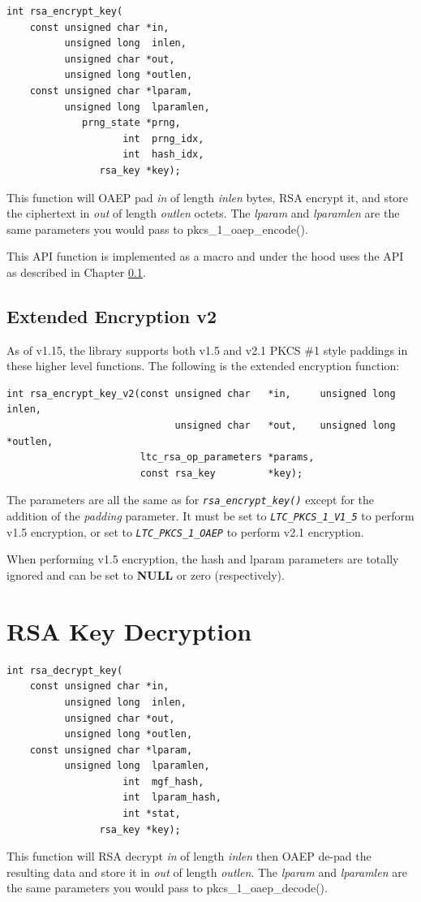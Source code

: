 \documentclass[synpaper]{book}
\newcommand{\code}[1]{\texttt{\textit{#1}}}
\newcommand{\mysection}[1]    %
	{                   %
	\section{#1}
   \markboth{\textsf{www.libtom.net}}{\thesection ~ {#1}}
	}
\begin{document}
\begin{verbatim}
int rsa_encrypt_key(
    const unsigned char *in,
          unsigned long  inlen,
          unsigned char *out,
          unsigned long *outlen,
    const unsigned char *lparam,
          unsigned long  lparamlen,
             prng_state *prng,
                    int  prng_idx,
                    int  hash_idx,
                rsa_key *key);
\end{verbatim}
This function will OAEP pad \textit{in} of length \textit{inlen} bytes, RSA encrypt it, and store the ciphertext
in \textit{out} of length \textit{outlen} octets.  The \textit{lparam} and \textit{lparamlen} are the same parameters you would pass
to  pkcs\_1\_oaep\_encode().

This API function is implemented as a macro and under the hood uses the API as described in Chapter \ref{rsa-encrypt-v2}.

\subsection{Extended Encryption v2}
\label{rsa-encrypt-v2}
As of v1.15, the library supports both v1.5 and v2.1 PKCS \#1 style paddings in these higher level functions.  The following is the extended
encryption function:

\begin{verbatim}
int rsa_encrypt_key_v2(const unsigned char   *in,     unsigned long  inlen,
                             unsigned char   *out,    unsigned long *outlen,
                       ltc_rsa_op_parameters *params,
                       const rsa_key         *key);
\end{verbatim}

 
The parameters are all the same as for \code{rsa\_encrypt\_key()} except for the addition of the \textit{padding} parameter.  It must be set to
\code{LTC\_PKCS\_1\_V1\_5} to perform v1.5 encryption, or set to \code{LTC\_PKCS\_1\_OAEP} to perform v2.1 encryption.

When performing v1.5 encryption, the hash and lparam parameters are totally ignored and can be set to \textbf{NULL} or zero (respectively).

\mysection{RSA Key Decryption}
\begin{verbatim}
int rsa_decrypt_key(
    const unsigned char *in,
          unsigned long  inlen,
          unsigned char *out,
          unsigned long *outlen,
    const unsigned char *lparam,
          unsigned long  lparamlen,
                    int  mgf_hash,
                    int  lparam_hash,
                    int *stat,
                rsa_key *key);
\end{verbatim}
This function will RSA decrypt \textit{in} of length \textit{inlen} then OAEP de-pad the resulting data and store it in
\textit{out} of length \textit{outlen}.  The \textit{lparam} and \textit{lparamlen} are the same parameters you would pass
to pkcs\_1\_oaep\_decode().
\end{document}
